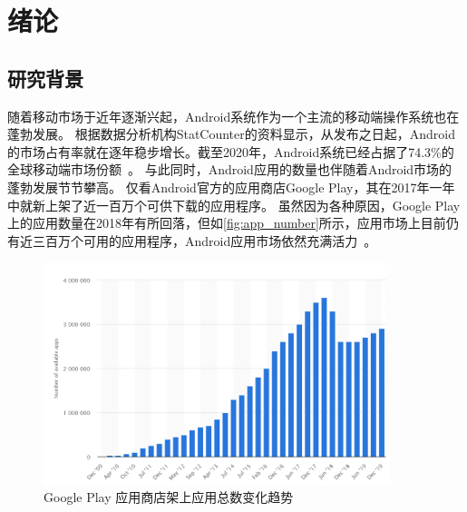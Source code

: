 \chapter {绪论}
\label{chp:intro}

\section{研究背景}

随着移动市场于近年逐渐兴起，Android系统作为一个主流的移动端操作系统也在蓬勃发展。
根据数据分析机构StatCounter的资料显示，从发布之日起，Android的市场占有率就在逐年稳步增长。截至2020年，Android系统已经占据了74.3\%的全球移动端市场份额~\cite{MobileOSMktShare}。
与此同时，Android应用的数量也伴随着Android市场的蓬勃发展节节攀高。
仅看Android官方的应用商店Google Play，其在2017年一年中就新上架了近一百万个可供下载的应用程序。
虽然因为各种原因，Google Play上的应用数量在2018年有所回落，但如\autoref{fig:app_number}所示，应用市场上目前仍有近三百万个可用的应用程序，Android应用市场依然充满活力~\cite{StatistaAppNumber}。

\begin{figure}[htbp]
	\centering
	\includegraphics[width=0.9\textwidth]{./Figures/edwin-intro-app-number.png}
	\caption{Google Play 应用商店架上应用总数变化趋势}
	\label{fig:app_number}
\end{figure}

